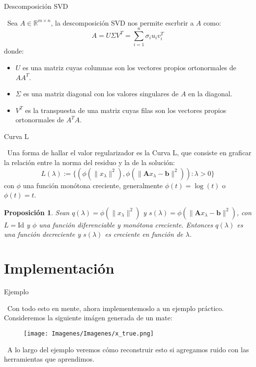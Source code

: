 \documentclass[12pt]{beamer}
\newtheorem{proposition}{Proposición}
\begin{document}
	\begin{frame}{Descomposición SVD}
		
		\ Sea $A \in \mathbb{R}^{m \times n}$, la descomposición SVD nos permite escrbrir a $A$ como: $$A = U \Sigma V^T = \sum_{i=1}^{n} \sigma_i u_i v_i^T$$
		donde:
		
		\begin{itemize}
			\item \( U \) es una matriz cuyas columnas son los vectores propios ortonormales de \( A A^T \).
			\item \( \Sigma \) es una matriz diagonal con los valores singulares de \( A \) en la diagonal.
			\item \( V^T \) es la transpuesta de una matriz cuyas filas son los vectores propios ortonormales de \( A^T A \).
		\end{itemize}
		
	\end{frame}
	
	\begin{frame}{Curva L}
		
		\ Una forma de hallar el valor regularizador es la Curva L, que consiste en graficar la relación entre la norma del residuo y la de la solución: $$L(\lambda) := \{(\phi (\| x_\lambda  \|^2), \phi (\| \mathbf{A}x_\lambda - \mathbf{b} \|^2) ): \lambda > 0\}$$ con $\phi$ una función monótona creciente, generalmente $\phi(t) = \log(t)$ o $\phi(t) = t$.
		
		\begin{proposition}
			Sean $q(\lambda) = \phi (\| x_\lambda  \|^2)$ y $s(\lambda) = \phi (\| \mathbf{A}x_\lambda - \mathbf{b} \|^2 )$, con $L = \mathrm{Id}$ y $\phi$ una función diferenciable y monótona creciente. Entonces $q(\lambda)$ es una función decreciente y $s(\lambda)$ es creciente en función de $\lambda$.
		\end{proposition}
		
	\end{frame}
	
	
	\section{Implementación}
	
	\begin{frame}{Ejemplo}
		
		\ Con todo esto en mente, ahora implementemoslo a un ejemplo práctico. Consideremos la siguiente imágen generada de un mate:
		\begin{figure}[htp]
			\centering
			\texttt{[image: Imagenes/Imagenes/x\_true.png]}
		\end{figure}
		
		\ A lo largo del ejemplo veremos cómo reconstruir esto si agregamos ruido con las herramientas que aprendimos.
		
	\end{frame}
	
\end{document}
